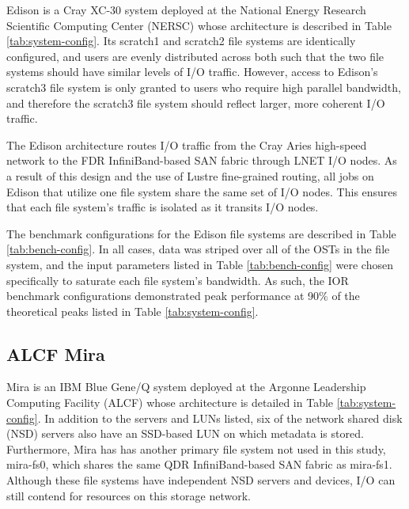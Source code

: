Edison is a Cray XC-30 system deployed at the National Energy Research Scientific Computing Center (NERSC) whose architecture is described in Table \ref{tab:system-config}.
Its scratch1 and scratch2 file systems are identically configured, and users are evenly distributed across both such that the two file systems should have similar levels of I/O traffic.
However, access to Edison's scratch3 file system is only granted to users who require high parallel bandwidth, and therefore the scratch3 file system should reflect larger, more coherent I/O traffic.

The Edison architecture routes I/O traffic from the Cray Aries high-speed network to the FDR InfiniBand-based SAN fabric through LNET I/O nodes.
As a result of this design and the use of Lustre fine-grained routing, all jobs on Edison that utilize one file system share the same set of I/O nodes.
This ensures that each file system's traffic is isolated as it transits I/O nodes.

The benchmark configurations for the Edison file systems are described in Table \ref{tab:bench-config}.
In all cases, data was striped over all of the OSTs in the file system, and the input parameters listed in Table \ref{tab:bench-config} were chosen specifically to saturate each file system's bandwidth.
As such, the IOR benchmark configurations demonstrated peak performance at 90\% of the theoretical peaks listed in Table \ref{tab:system-config}.

\subsection{ALCF Mira} \label{sec:platforms/mira}

Mira is an IBM Blue Gene/Q system deployed at the Argonne Leadership Computing Facility (ALCF) whose architecture is detailed in Table \ref{tab:system-config}.  In addition to the servers and LUNs listed, six of the network shared disk (NSD) servers also have an SSD-based LUN on which metadata is stored.  Furthermore, 
Mira has has another primary file system not used in this study, mira-fs0, which shares the same QDR InfiniBand-based SAN fabric as mira-fs1.
Although these file systems have independent NSD servers and devices, I/O can still contend for resources on this storage network.


